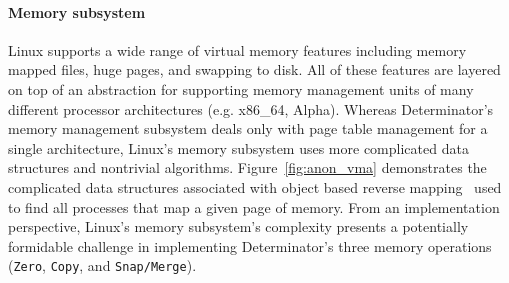 \begin{itemize}
\paragraph{Memory subsystem} Linux supports a wide range of virtual memory
features including memory mapped files, huge pages, and swapping to disk. All
of these features are layered on top of an abstraction for supporting memory
management units of many different processor architectures (e.g. x86\_64,
Alpha). Whereas Determinator's memory management subsystem deals
only with page table management for a single architecture, Linux's memory
subsystem uses more complicated data structures and nontrivial algorithms.
Figure~\ref{fig:anon_vma} demonstrates the complicated data structures associated
with object based reverse mapping~\cite{overlyanon} used to find all processes
that map a given page of memory. From an implementation perspective, Linux's
memory subsystem's complexity presents a potentially formidable challenge in
implementing Determinator's three memory operations ({\tt Zero}, {\tt Copy}, and
{\tt Snap/Merge}).


\end{itemize}
